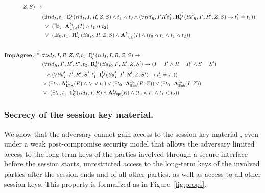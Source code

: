 \begin{figure*}[ht]
\begin{align*}
\mSessKey, S)
    \rightarrow\\
    &(\exists \mTID_I, t_1\mLogicDot \mIStart^{t_1}(\mTID_I, I, R, \mSessKey, S) \land t_1 \lessdot t_2
    \land (\forall \mTID_R', I' R' t_1' \mLogicDot \mRComplete^{t_1'}(\mTID_R', I' , R', \mSessKey, S)
        \rightarrow t_1' \doteq t_1))\\
    &\ \lor\ (\exists t_1\mLogicDot \mRevLTK^{t_1}(I) \land t_1 \lessdot t_2)\\
    &\ \lor\ (\exists t_0, t_1\mLogicDot \mRStart^{t_0}(\mTID_R, R, \mSessKey, S) \land \mTEE^{t_1}(I) \land (t_0 \lessdot t_1 \land t_1 \lessdot t_2))\\[2em]
%
    \mPredImpI \triangleq\ &
    \forall \mTID_I, I, R, \mSessKey, S, t_1\mLogicDot \mIComplete^{t_1}(\mTID_I, I, R, \mSessKey, 
S)
    \rightarrow\\
      &(\forall \mTID_R, I', R', S', t_2\mLogicDot \mRComplete^{t_2}(\mTID_R, I', R', \mSessKey, S') \rightarrow
             (I=I' \land R=R' \land S=S')\\
      &\ \ \land (\forall \mTID_I', I', R', S', t_1'\mLogicDot
        \mIComplete^{t_1'}(\mTID_I', I', R', \mSessKey, S') \rightarrow t_1' \doteq t_1
        ))\\
    &\lor(\exists t_0\mLogicDot \mRevLTK^{t_0}(R) \land t_0 \lessdot t_1)
    \lor(\exists t_0\mLogicDot \mRevEph^{t_0}(R, \mSessKey))
    \lor(\exists t_0\mLogicDot \mRevEph^{t_0}(I, \mSessKey))\\
    &\lor\ (\exists t_0, t_1\mLogicDot \mIStart^{t_0}(\mTID_I, I, R) \land \mTEE^{t_1}(R) \land (t_0 \lessdot t_1 \land t_1 \lessdot t_2))
\end{align*}
%
\caption{Formalization of security properties and adversary model.}
\label{fig:props}
\end{figure*}


\subsubsection{Secrecy of the session key material.}
\label{sec:secrecy}
We show that the adversary cannot gain access to the session key material \mSessKey{},
even under a weak post-compromise security model that allows the adversary limited access
to the long-term keys of the parties involved through a secure interface before the session starts, 
unrestricted access to the long-term keys of the involved parties after the session ends
and of all other parties, as well as access to all other session keys.
%
This property is formalized as \mPredPcs{}
in Figure~\ref{fig:props}.
%

